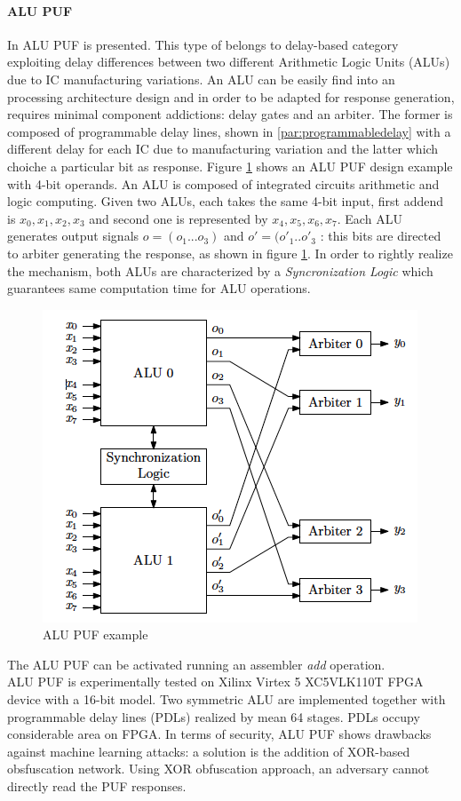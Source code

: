 \documentclass[../tesi.tex]{subfiles}
\begin{document}
\paragraph{ALU PUF}
In \cite{kong2014pufatt} ALU PUF is presented. This type of \puf{} belongs to delay-based category exploiting delay differences between two different Arithmetic Logic Units (ALUs) due to IC manufacturing variations. 
An ALU can be easily find into an processing architecture design and in order to be adapted for \puf{} response generation,  requires minimal component addictions: delay gates and an arbiter. 
The former is composed of programmable delay lines, shown in \ref{par:programmabledelay} with a different delay for each IC due to manufacturing  variation and the latter which choiche a particular bit as response. 
Figure \ref{fig:alupuf} shows an ALU PUF design example with 4-bit operands. An ALU is composed of integrated circuits arithmetic and logic computing. Given two ALUs, each takes the same 4-bit input, first addend is $x_{0},x_{1},x_{2},x_{3}$ and second one is represented by $x_{4},x_{5},x_{6},x_{7}$. Each ALU generates output signals $o=(o_{1}...o_{3})$ and $o'=(o'_{1}..o'_{3}$ : this bits are directed to arbiter generating the response, as shown in figure \ref{fig:alupuf}.
In order to rightly realize the mechanism, both ALUs are characterized by a \emph{Syncronization Logic} which guarantees same computation time for ALU operations. \\
\begin{figure}
\centering
\includegraphics[scale=0.60]{images/alupuf.png}
\caption{ALU PUF example}
\label{fig:alupuf}
\end{figure}
The ALU PUF can be activated running an assembler \emph{add} operation. \\
ALU PUF is experimentally tested on Xilinx Virtex 5 XC5VLK110T FPGA device with a 16-bit model. Two symmetric ALU are implemented together with programmable delay lines (PDLs) realized by mean 64 stages. PDLs occupy considerable area on FPGA. 
In terms of security, ALU PUF shows drawbacks against machine learning attacks: a solution is the addition of XOR-based obsfuscation network. Using XOR obfuscation approach, an adversary cannot directly read the PUF responses. 
\end{document}
